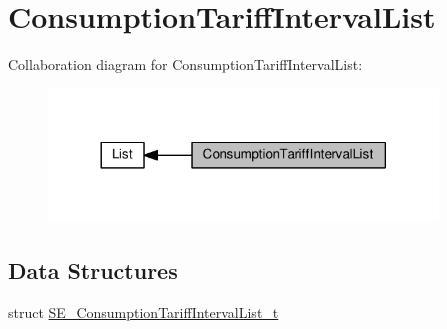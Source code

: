 \hypertarget{group__ConsumptionTariffIntervalList}{}\section{Consumption\+Tariff\+Interval\+List}
\label{group__ConsumptionTariffIntervalList}
Collaboration diagram for Consumption\+Tariff\+Interval\+List\+:\nopagebreak
\begin{figure}[H]
\begin{center}
\leavevmode
\includegraphics[width=293pt]{group__ConsumptionTariffIntervalList}
\end{center}
\end{figure}
\subsection*{Data Structures}
\begin{DoxyCompactItemize}
\item 
struct \hyperlink{structSE__ConsumptionTariffIntervalList__t}{S\+E\+\_\+\+Consumption\+Tariff\+Interval\+List\+\_\+t}
\end{DoxyCompactItemize}
